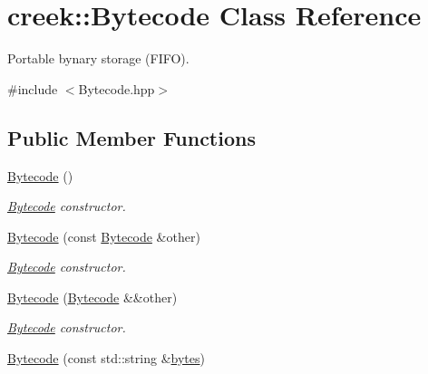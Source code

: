 \hypertarget{classcreek_1_1_bytecode}{}\section{creek\+:\+:Bytecode Class Reference}
\label{classcreek_1_1_bytecode}


Portable bynary storage (F\+I\+FO).  




{\ttfamily \#include $<$Bytecode.\+hpp$>$}

\subsection*{Public Member Functions}
\begin{DoxyCompactItemize}
\item 
\hyperlink{classcreek_1_1_bytecode_a668f341fd5cda5200fb5deef5e17ad81}{Bytecode} ()\hypertarget{classcreek_1_1_bytecode_a668f341fd5cda5200fb5deef5e17ad81}{}\label{classcreek_1_1_bytecode_a668f341fd5cda5200fb5deef5e17ad81}

\begin{DoxyCompactList}\small\item\em {\ttfamily \hyperlink{classcreek_1_1_bytecode}{Bytecode}} constructor. \end{DoxyCompactList}\item 
\hyperlink{classcreek_1_1_bytecode_af97eb4c05bab64a4f8456bb66cb40ed8}{Bytecode} (const \hyperlink{classcreek_1_1_bytecode}{Bytecode} \&other)\hypertarget{classcreek_1_1_bytecode_af97eb4c05bab64a4f8456bb66cb40ed8}{}\label{classcreek_1_1_bytecode_af97eb4c05bab64a4f8456bb66cb40ed8}

\begin{DoxyCompactList}\small\item\em {\ttfamily \hyperlink{classcreek_1_1_bytecode}{Bytecode}} constructor. \end{DoxyCompactList}\item 
\hyperlink{classcreek_1_1_bytecode_ae27bf61cb994242f6ed0fb579214141f}{Bytecode} (\hyperlink{classcreek_1_1_bytecode}{Bytecode} \&\&other)\hypertarget{classcreek_1_1_bytecode_ae27bf61cb994242f6ed0fb579214141f}{}\label{classcreek_1_1_bytecode_ae27bf61cb994242f6ed0fb579214141f}

\begin{DoxyCompactList}\small\item\em {\ttfamily \hyperlink{classcreek_1_1_bytecode}{Bytecode}} constructor. \end{DoxyCompactList}\item 
\hyperlink{classcreek_1_1_bytecode_a4c90af5d5f54c66292a64256b603f159}{Bytecode} (const std\+::string \&\hyperlink{classcreek_1_1_bytecode_a79f346e111024b762d946db5587bc2a3}{bytes})\hypertarget{classcreek_1_1_bytecode_a4c90af5d5f54c66292a64256b603f159}{}\label{classcreek_1_1_bytecode_a4c90af5d5f54c66292a64256b603f159}


\end{DoxyCompactItemize}

